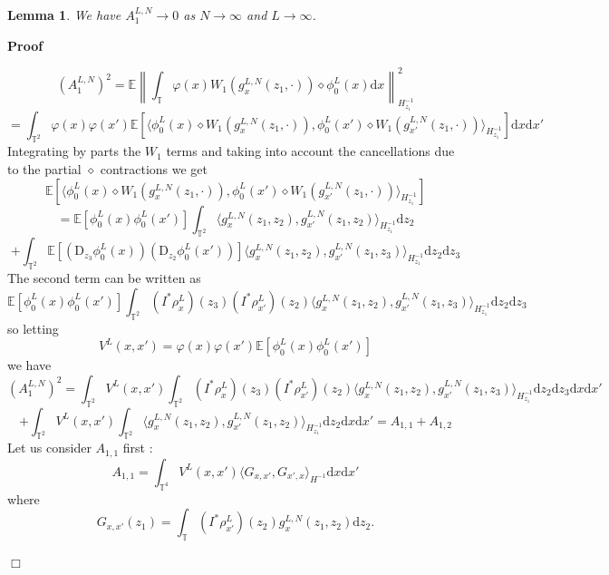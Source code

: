\documentclass[a4paper,11pt]{article}
\newcommand{\mathD}{\mathrm{D}}
\newcommand{\mathd}{\mathrm{d}}
\newenvironment{proof}{\noindent\textbf{Proof\ }}{\hspace*{\fill}$\Box$\medskip}
\newtheorem{lemma}{Lemma}
\begin{document}
\begin{lemma}
  We have $A_1^{L, N} \rightarrow 0$ as $N \rightarrow \infty$ and $L
  \rightarrow \infty$.
\end{lemma}

\begin{proof}
  
  \[ (A_1^{L, N})^2 =\mathbb{E} \left\| \int_{\mathbb{T}} \varphi (x) W_1
     (g_x^{L, N} (z_1, \cdot)) \diamond \phi_0^L (x) \mathd x \right\|_{H^{-
     1}_{z_1}}^2 \]
  \[ = \int_{\mathbb{T}^2} \varphi (x) \varphi (x') \mathbb{E} \left[
     \langle \phi_0^L (x) \diamond W_1 (g_x^{L, N} (z_1, \cdot)), \phi_0^L
     (x') \diamond W_1 (g_{x'}^{L, N} (z_1, \cdot)) \rangle_{H^{- 1}_{z_1}}
     \right] \mathd x \mathd x' \]
  Integrating by parts the $W_1$ terms and taking into account the
  cancellations due to the partial $\diamond$ contractions we get
  \[ \mathbb{E} \left[ \langle \phi_0^L (x) \diamond W_1 (g_x^{L, N} (z_1,
     \cdot)), \phi_0^L (x') \diamond W_1 (g_{x'}^{L, N} (z_1, \cdot))
     \rangle_{H^{- 1}_{z_1}} \right] \]
  \[ =\mathbb{E} [\phi_0^L (x) \phi_0^L (x')] \int_{\mathbb{T}^2} \langle
     g_x^{L, N} (z_1, z_2), g_{x'}^{L, N} (z_1, z_2) \rangle_{H^{- 1}_{z_1}}
     \mathd z_2 \]
  \[ + \int_{\mathbb{T}^2} \mathbb{E} [(\mathD_{z_3} \phi_0^L (x))
     (\mathD_{z_2} \phi_0^L (x'))] \langle g_x^{L, N} (z_1, z_2), g_{x'}^{L,
     N} (z_1, z_3) \rangle_{H^{- 1}_{z_1}} \mathd z_2 \mathd z_3 \]
  The second term can be written as
  \[ \mathbb{E} [\phi_0^L (x) \phi_0^L (x')] \int_{\mathbb{T}^2} (I^{\ast}
     \rho_x^L) (z_3) (I^{\ast} \rho_{x'}^L) (z_2) \langle g_x^{L, N} (z_1,
     z_2), g_{x'}^{L, N} (z_1, z_3) \rangle_{H^{- 1}_{z_1}} \mathd z_2 \mathd
     z_3 \]
  so letting
  \[ V^L (x, x') = \varphi (x) \varphi (x') \mathbb{E} [_{} \phi_0^L (x)
     \phi_0^L (x')] \]
  we have
  \[ (A_1^{L, N})^2 = \int_{\mathbb{T}^2} V^L (x, x') \int_{\mathbb{T}^2}
     (I^{\ast} \rho_x^L) (z_3) (I^{\ast} \rho_{x'}^L) (z_2) \langle g_x^{L, N}
     (z_1, z_2), g_{x'}^{L, N} (z_1, z_3) \rangle_{H^{- 1}_{z_1}} \mathd z_2
     \mathd z_3 \mathd x \mathd x' \]
  \[ + \int_{\mathbb{T}^2} V^L (x, x') \int_{\mathbb{T}^2} \langle g_x^{L,
     N} (z_1, z_2), g_{x'}^{L, N} (z_1, z_2) \rangle_{H^{- 1}_{z_1}} \mathd
     z_2 \mathd x \mathd x' 
   = A_{1, 1} + A_{1, 2} \]
  Let us consider $A_{1, 1}$ first :
  \[ A_{1, 1} = \int_{\mathbb{T}^4} V^L (x, x') \langle G_{x, x'}, G_{x', x}
     \rangle_{H^{- 1}} \mathd x \mathd x' \]
  where
  \[ G_{x, x'} (z_1) = \int_{\mathbb{T}} (I^{\ast} \rho_{x'}^L) (z_2) g_x^{L,
     N} (z_1, z_2) \mathd z_2 . \]

\end{proof}
\end{document}
